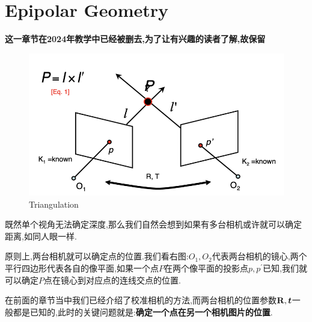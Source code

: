 \section{Epipolar Geometry}

\textbf{这一章节在2024年教学中已经被删去,为了让有兴趣的读者了解,故保留}

\begin{figure}
	\includegraphics[scale=0.3]{figures/triangulation.png}
	\caption{Triangulation}
\end{figure}

既然单个视角无法确定深度,那么我们自然会想到如果有多台相机或许就可以确定距离,如同人眼一样.

原则上,两台相机就可以确定点的位置.我们看右图:$O_1, O_2$代表两台相机的镜心,两个平行四边形代表各自的像平面,如果一个点$P$在两个像平面的投影点$p, p^\prime$已知,我们就可以确定$P$点在镜心到对应点的连线交点的位置.

在前面的章节当中我们已经介绍了校准相机的方法,而两台相机的位置参数$\bold{R}, \boldsymbol t$一般都是已知的,此时的关键问题就是:\textbf{确定一个点在另一个相机图片的位置}.



